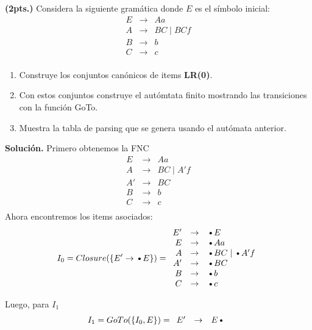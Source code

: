 
\textbf{(2pts.)} Considera la siguiente gram\'atica donde $E$ es el s\'imbolo
inicial:
\[
\begin{array}{rcl}
  E & \to & Aa\\
  A & \to & BC \mid BCf\\
  B & \to & b\\
  C & \to & c\\
\end{array}
\]
\begin{enumerate}
\item Construye los conjuntos can\'onicos de items \textbf{LR(0)}.
\item Con estos conjuntos construye el aut\'omtata finito mostrando las transiciones
  con la funci\'on GoTo.
\item Muestra la tabla de parsing que se genera usando el aut\'omata anterior. 
\end{enumerate}

\textbf{Solución.} Primero obtenemos la FNC
\[
\begin{array}{rcl}
  E  & \to & Aa\\
  A  & \to & BC \mid A'f\\
  A' & \to & BC\\
  B  & \to & b\\
  C  & \to & c\\
\end{array}
\]
Ahora encontremos los items asociados:
\[
I_0 = Closure(\{E' \rightarrow \text{\textbullet}E\}) = 
\begin{array}{rcl}
  E'  & \to & \text{\textbullet}E \\
  E  & \to & \text{\textbullet}Aa \\
  A  & \to & \text{\textbullet}BC \mid \text{\textbullet}A'f \\
  A' & \to & \text{\textbullet}BC\\
  B  & \to & \text{\textbullet}b \\
  C  & \to & \text{\textbullet}c \\
\end{array}
\]

Luego, para $I_1$
\[
I_1 = GoTo(\{I_0,E\}) = 
\begin{array}{rcl}
  E'  & \to & E\text{\textbullet}\\
\end{array}
\]

